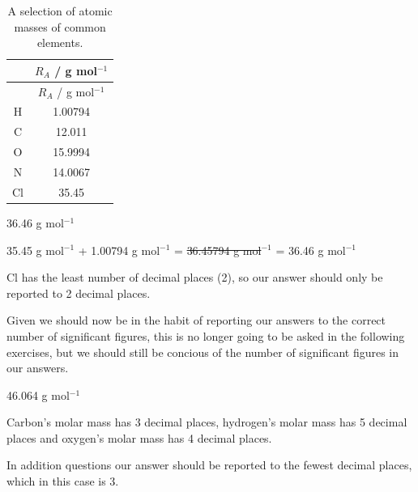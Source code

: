 \documentclass[
  letterpaper,
  DIV=11,
  numbers=noendperiod]{scrreprt}
\begin{document}
\begin{longtable}[]{@{}cc@{}}
\caption{A selection of atomic masses of common
elements.}\label{tbl-atomicmassescommon}\tabularnewline
\toprule\noalign{}
& \(R_A\) / g mol\(^{-1}\) \\
\midrule\noalign{}
\endfirsthead
\toprule\noalign{}
& \(R_A\) / g mol\(^{-1}\) \\
\midrule\noalign{}
\endhead
\bottomrule\noalign{}
\endlastfoot
H & 1.00794 \\
C & 12.011 \\
O & 15.9994 \\
N & 14.0067 \\
Cl & 35.45 \\
\end{longtable}

\begin{tcolorbox}[enhanced jigsaw, arc=.35mm, bottomrule=.15mm, bottomtitle=1mm, breakable, colback=white, colbacktitle=quarto-callout-note-color!10!white, colframe=quarto-callout-note-color-frame, coltitle=black, left=2mm, leftrule=.75mm, opacityback=0, opacitybacktitle=0.6, rightrule=.15mm, title=\textcolor{quarto-callout-note-color}{\faInfo}\hspace{0.5em}{What is the molar mass of HCl to the correct number of significant
figures?}, titlerule=0mm, toprule=.15mm, toptitle=1mm]

36.46 g mol\(^{-1}\)

35.45 g mol\(^{-1}\) + 1.00794 g mol\(^{-1}\) = \st{36.45794 g
mol}\(^{-1}\) = 36.46 g mol\(^{-1}\)

Cl has the least number of decimal places (2), so our answer should only
be reported to 2 decimal places.

\end{tcolorbox}

Given we should now be in the habit of reporting our answers to the
correct number of significant figures, this is no longer going to be
asked in the following exercises, but we should still be concious of the
number of significant figures in our answers.

\begin{tcolorbox}[enhanced jigsaw, arc=.35mm, bottomrule=.15mm, bottomtitle=1mm, breakable, colback=white, colbacktitle=quarto-callout-note-color!10!white, colframe=quarto-callout-note-color-frame, coltitle=black, left=2mm, leftrule=.75mm, opacityback=0, opacitybacktitle=0.6, rightrule=.15mm, title=\textcolor{quarto-callout-note-color}{\faInfo}\hspace{0.5em}{What is the molar mass of C\(_2\)H\(_5\)OH?}, titlerule=0mm, toprule=.15mm, toptitle=1mm]

46.064 g mol\(^{-1}\)

Carbon's molar mass has 3 decimal places, hydrogen's molar mass has 5
decimal places and oxygen's molar mass has 4 decimal places.

In addition questions our answer should be reported to the fewest
decimal places, which in this case is 3.

\end{tcolorbox}
\end{document}
